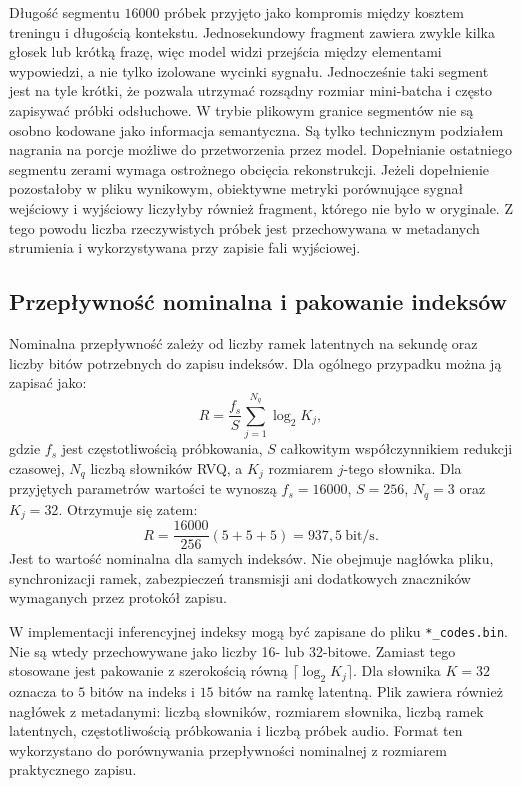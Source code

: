 Długość segmentu \(16000\) próbek przyjęto jako kompromis między kosztem treningu i długością kontekstu. Jednosekundowy fragment zawiera zwykle kilka głosek lub krótką frazę, więc model widzi przejścia między elementami wypowiedzi, a nie tylko izolowane wycinki sygnału. Jednocześnie taki segment jest na tyle krótki, że pozwala utrzymać rozsądny rozmiar mini-batcha i często zapisywać próbki odsłuchowe. W trybie plikowym granice segmentów nie są osobno kodowane jako informacja semantyczna. Są tylko technicznym podziałem nagrania na porcje możliwe do przetworzenia przez model. Dopełnianie ostatniego segmentu zerami wymaga ostrożnego obcięcia rekonstrukcji. Jeżeli dopełnienie pozostałoby w pliku wynikowym, obiektywne metryki porównujące sygnał wejściowy i wyjściowy liczyłyby również fragment, którego nie było w oryginale. Z tego powodu liczba rzeczywistych próbek jest przechowywana w metadanych strumienia i wykorzystywana przy zapisie fali wyjściowej.

\subsection{Przepływność nominalna i pakowanie indeksów}

Nominalna przepływność zależy od liczby ramek latentnych na sekundę oraz liczby bitów potrzebnych do zapisu indeksów. Dla ogólnego przypadku można ją zapisać jako:
\[
R = \frac{f_s}{S} \sum_{j=1}^{N_q} \log_2 K_j,
\]
gdzie \(f_s\) jest częstotliwością próbkowania, \(S\) całkowitym współczynnikiem redukcji czasowej, \(N_q\) liczbą słowników RVQ, a \(K_j\) rozmiarem \(j\)-tego słownika. Dla przyjętych parametrów wartości te wynoszą \(f_s=16000\), \(S=256\), \(N_q=3\) oraz \(K_j=32\). Otrzymuje się zatem:
\[
R = \frac{16000}{256}(5+5+5) = 937{,}5\ \mathrm{bit/s}.
\]
Jest to wartość nominalna dla samych indeksów. Nie obejmuje nagłówka pliku, synchronizacji ramek, zabezpieczeń transmisji ani dodatkowych znaczników wymaganych przez protokół zapisu.

W implementacji inferencyjnej indeksy mogą być zapisane do pliku \texttt{*\_codes.bin}. Nie są wtedy przechowywane jako liczby 16- lub 32-bitowe. Zamiast tego stosowane jest pakowanie z szerokością równą \(\lceil \log_2 K_j \rceil\). Dla słownika \(K=32\) oznacza to \(5\) bitów na indeks i \(15\) bitów na ramkę latentną. Plik zawiera również nagłówek z metadanymi: liczbą słowników, rozmiarem słownika, liczbą ramek latentnych, częstotliwością próbkowania i liczbą próbek audio. Format ten wykorzystano do porównywania przepływności nominalnej z rozmiarem praktycznego zapisu.

